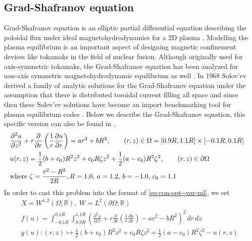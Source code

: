 \subsection{Grad-Shafranov equation} Grad-Shafranov equation is an elliptic partial differential equation describing the poloidal flux under ideal magnetohydrodynamics for a 2D plasma \cite{smithaaxisymmetric}.  Modelling the plasma equilibrium is an important aspect of designing magnetic confinement devices like tokamaks in the field of nuclear fusion. Although originally used for axis-symmetric tokamaks, the Grad-Shafranov equation has been analyzed for non-axis symmetric magnetohydrodynamic equilibrium as well \cite{burby2020generalized}. In 1968 Solov'ev derived a family of analytic solutions for the Grad-Shafranov equation under the assumption that there is distributed toroidal
current filling all space \cite{xu2019vacuum} and since then these Solev'ev solutions have become an import benchmarking tool for plasma equilibrium codes \cite{johnson1979numerical}. Below we describe the Grad-Shafranov equation, this specific version can also be found in \cite{xu2019vacuum}. 
\begin{equation}
\begin{aligned}
    &\frac{\partial^2 u}{\partial z^2}+r\frac{\partial}{\partial r}\left(\frac{1}{r}\frac{\partial u}{\partial r}\right) =ar^2 + bR^2,\qquad (r,z)\in\Omega= [0.9R, 1.1R]\times[-0.1R, 0.1R]\\
    & u(r, z) = \frac{1}{2}(b+c_0)R^2z^2+c_0R\zeta z^2+\frac{1}{2}(a-c_0)R^2\zeta^2, \qquad (r, z)\in{\partial\Omega}\\
    &\text{\rm where }\zeta =\frac{r^2-R^2}{2R}, R=1.0,\, a = 1.2,\,b=-1.0,\, c_0=1.1
\end{aligned}
\end{equation}
In order to cast this problem into the format of \eqref{eq:con-opt--var-ml}, we set
\begin{equation}
\begin{aligned}
    &X = W^{1,2}(\Omega;\mathbb R),\;W=L^{2}(\partial\Omega; \mathbb R)\\
    &f(u) = \int_{-0.1R}^{0.1R}\int_{0.9R}^{1.1R}\left(\frac{\partial^2 u}{\partial z^2}+r\frac{\partial}{\partial r}\left(\frac{1}{r}\frac{\partial u}{\partial r}\right) -ar^2 - bR^2\right)^2\,dr\,dz\\
    &g(u): (r,z)\mapsto \frac{1}{2}(b+c_0)R^2z^2+c_0R\zeta z^2+\frac{1}{2}(a-c_0)R^2\zeta^2 - u(r, z)
\end{aligned}\label{eq:GS--var-ml}
\end{equation}
